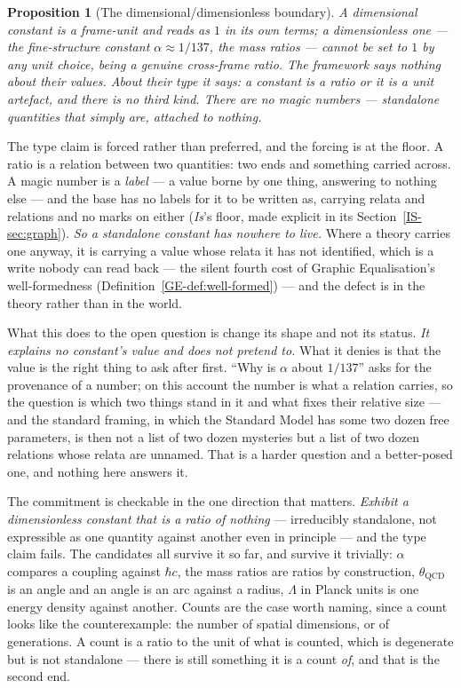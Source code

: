 \documentclass[11pt,a4paper]{article}
\newtheorem{proposition}[definition]{Proposition}
\theoremstyle{remark}\newtheorem{remark}[definition]{Remark}
\begin{document}
\begin{proposition}[The dimensional/dimensionless boundary]\label{prop:dim-boundary}
A dimensional constant is a frame-unit and reads as $1$ in its own terms; a
dimensionless one --- the fine-structure constant $\alpha\approx1/137$, the mass
ratios --- cannot be set to $1$ by any unit choice, being a genuine cross-frame
\emph{ratio}. The framework says nothing about their values. About their type it
says: a constant is a ratio or it is a unit artefact, and there is no third kind.
There are no magic numbers --- standalone quantities that simply are, attached to
nothing.
\end{proposition}

The type claim is forced rather than preferred, and the forcing is at the floor. A ratio is a
relation between two quantities: two ends and something carried across. A magic number is a
\emph{label} --- a value borne by one thing, answering to nothing else --- and the base has no labels
for it to be written as, carrying relata and relations and no marks on either (\emph{Is}'s floor,
made explicit in its Section~\ref{IS-sec:graph}). \emph{So a standalone constant has nowhere to
live.} Where a theory carries one anyway, it is carrying a value whose relata it has not identified, which is a write nobody can read
back --- the silent fourth cost of Graphic Equalisation's well-formedness
(Definition~\ref{GE-def:well-formed}) --- and the defect is in the
theory rather than in the world.

What this does to the open question is change its shape and not its status. \emph{It explains no
constant's value and does not pretend to.} What it denies is that the value is the right thing to ask
after first. ``Why is $\alpha$ about $1/137$'' asks for the provenance of a number; on this account
the number is what a relation carries, so the question is which two things stand in it and what fixes
their relative size --- and the standard framing, in which the Standard Model has some two dozen free
parameters, is then not a list of two dozen mysteries but a list of two dozen relations whose relata
are unnamed. That is a harder question and a better-posed one, and nothing here answers it.

The commitment is checkable in the one direction that matters. \emph{Exhibit a dimensionless constant
that is a ratio of nothing} --- irreducibly standalone, not expressible as one quantity against
another even in principle --- and the type claim fails. The candidates all survive it so far, and
survive it trivially: $\alpha$ compares a coupling against $\hbar c$, the mass ratios are ratios by
construction, $\theta_{\mathrm{QCD}}$ is an angle and an angle is an arc against a radius, $\Lambda$
in Planck units is one energy density against another. Counts are the case worth naming, since a
count looks like the counterexample: the number of spatial dimensions, or of generations. A count is a ratio to the unit of what is counted, which is degenerate but is not standalone --- there is still
something it is a count \emph{of}, and that is the second end.
\end{document}
